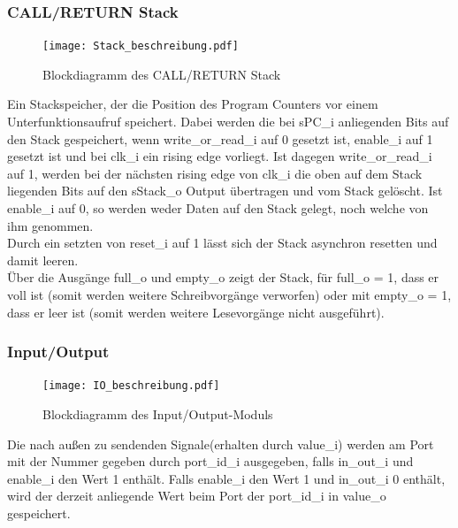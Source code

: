 \documentclass{scrartcl}
\begin{document}
\subsubsection{CALL/RETURN Stack}
\begin{figure}[H]
    \centering
    \texttt{[image: Stack\_beschreibung.pdf]}\\
    \caption{Blockdiagramm des CALL/RETURN Stack}
    \label{fig:Block_Stack}
\end{figure}

Ein Stackspeicher, der die Position des Program Counters vor einem Unterfunktionsaufruf speichert. Dabei werden die bei sPC\_i anliegenden Bits auf den Stack gespeichert, wenn write\_or\_read\_i auf 0 gesetzt ist, enable\_i auf 1 gesetzt ist und bei clk\_i ein rising edge vorliegt. Ist dagegen write\_or\_read\_i auf 1, werden bei der nächsten rising edge von clk\_i die oben auf dem Stack liegenden Bits auf den sStack\_o Output übertragen und vom Stack gelöscht. Ist enable\_i auf 0, so werden weder Daten auf den Stack gelegt, noch welche von ihm genommen. \\
Durch ein setzten von reset\_i auf 1 lässt sich der Stack asynchron resetten und damit leeren. \\
Über die Ausgänge full\_o und empty\_o zeigt der Stack, für full\_o = 1, dass er voll ist (somit werden weitere Schreibvorgänge verworfen) oder mit empty\_o = 1, dass er leer ist (somit werden weitere Lesevorgänge nicht ausgeführt).

\subsubsection{Input/Output}
\begin{figure}[H]
    \centering
    \texttt{[image: IO\_beschreibung.pdf]}
    \caption{Blockdiagramm des Input/Output-Moduls}
    \label{fig:Block_IO}
\end{figure}

Die nach außen zu sendenden Signale(erhalten durch value\_i) werden am Port mit der Nummer gegeben durch port\_id\_i ausgegeben, falls in\_out\_i und enable\_i den Wert 1 enthält. Falls enable\_i den Wert 1 und in\_out\_i 0 enthält, wird der derzeit anliegende Wert beim Port der port\_id\_i in value\_o gespeichert.
\end{document}
